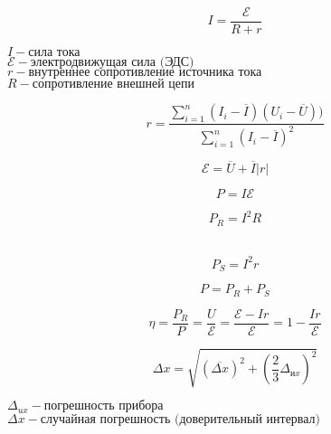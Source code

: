 \[
I = \frac{\mathcal{E}}{R + r}
\]

\begin{center}
    $I - \text{сила тока}$ \\
    $\mathcal{E} - \text{электродвижущая сила (ЭДС)}$ \\
    $r - \text{внутреннее сопротивление источника тока}$ \\
    $R - \text{сопротивление внешней цепи}$
\end{center}

\vspace{0.1cm}

\[
r = \frac{\sum\limits_{i=1}^{n}(I_i - \overline{I})(U_i - \overline{U}))}{\sum\limits_{i=1}^{n}(I_i - \overline{I})^2}
\]

\vspace{0.1cm}

\[
\mathcal{E} = \overline{U} + \overline{I}|r|
\]

\vspace{0.1cm}

\[
P = I\mathcal{E}
\]

\[
P_{R} = I^2R
\]\

\[
P_{S} = I^2r
\]

\[
P = P_{R} + P_{S}
\]

\vspace{0.1cm}

\[
\eta = \frac{P_{R}}{P} = \frac{U}{\mathcal{E}} = \frac{\mathcal{E} - Ir}{\mathcal{E}} = 1 - \frac{Ir}{\mathcal{E}}
\]

\vspace{0.1cm}

\[
\Delta x = \sqrt{\left(\overline{\Delta x}\right)^2 + \left(\frac{2}{3} \Delta_{\text{и}x}\right)^2}
\]

\begin{center}
    $\Delta_{ux} - \text{погрешность прибора}$ \\
    $\Delta x - \text{случайная погрешность (доверительный интервал)}$
\end{center}

\vspace{0.1cm}

